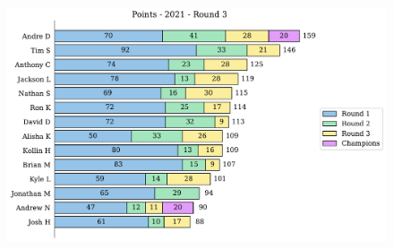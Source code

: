 \documentclass[10pt]{article}
\begin{document}
\begin{minipage}[t]{13cm}
    \begin{figure}[H]
        \vspace{-3.5cm}
        \includegraphics[width=12cm]{../../figures/2021/Points-2021-Round3.pdf}
    \end{figure}
\end{minipage}
\end{document}
